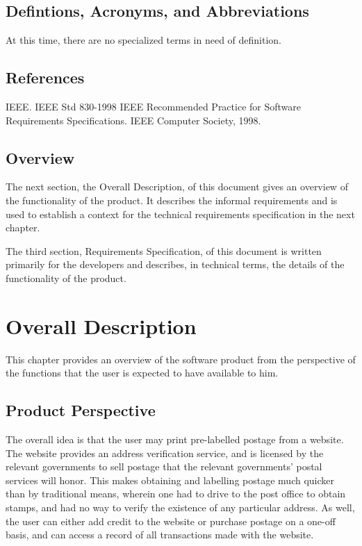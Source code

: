 \documentclass{scrreprt}
\begin{document}
\section{Defintions, Acronyms, and Abbreviations}

At this time, there are no specialized terms in need of definition.

\section{References}

IEEE. IEEE Std 830-1998 IEEE Recommended Practice for Software Requirements
Specifications. IEEE Computer Society, 1998.

\section{Overview}

The next section, the Overall Description, of this document gives an overview
of the functionality of the product. It describes the informal requirements and
is used to establish a context for the technical requirements specification in
the next chapter. 

The third section, Requirements Specification, of this document is written
primarily for the developers and describes, in technical terms, the details of
the functionality of the product. 

\chapter{Overall Description}

This chapter provides an overview of the software product from the perspective 
of the functions that the user is expected to have available to him.

\section{Product Perspective}

The overall idea is that the user may print pre-labelled postage from a
website. The website provides an address verification service, and is licensed
by the relevant governments to sell postage that the relevant governments’
postal services will honor. This makes obtaining and labelling postage much
quicker than by traditional means, wherein one had to drive to the post office
to obtain stamps, and had no way to verify the existence of any particular
address. As well, the user can either add credit to the website or purchase
postage on a one-off basis, and can access a record of all transactions made
with the website.
\end{document}
